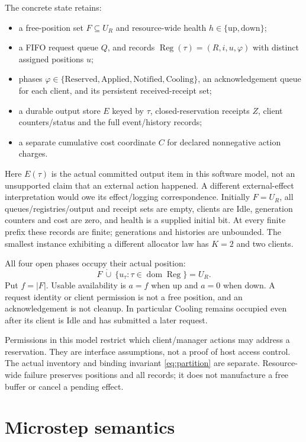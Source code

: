 \documentclass[11pt]{article}
\newcommand{\Reg}{\operatorname{Reg}}
\begin{document}
The concrete state retains:
\begin{itemize}
\item a free-position set $F\subseteq U_R$ and resource-wide health $h\in\{\mathrm{up},\mathrm{down}\}$;
\item a FIFO request queue $Q$, and records $\Reg(\tau)=(R,i,u,\varphi)$ with distinct assigned positions $u$;
\item phases $\varphi\in\{\mathrm{Reserved},\mathrm{Applied},\mathrm{Notified},\mathrm{Cooling}\}$, an acknowledgement queue for each client, and its persistent received-receipt set;
\item a durable output store $E$ keyed by $\tau$, closed-reservation receipts $Z$, client counters/status and the full event/history records;
\item a separate cumulative cost coordinate $C$ for declared nonnegative action charges.
\end{itemize}
Here $E(\tau)$ is the actual committed output item in this software model, not an unsupported claim that an external action happened. A different external-effect interpretation would owe its effect/logging correspondence. Initially $F=U_R$, all queues/registries/output and receipt sets are empty, clients are Idle, generation counters and cost are zero, and health is a supplied initial bit. At every finite prefix these records are finite; generations and histories are unbounded. The smallest instance exhibiting a different allocator law has $K=2$ and two clients.

All four open phases occupy their actual position:
\[
 F\ \dot\cup\ \{u_\tau:\tau\in\operatorname{dom}\Reg\}=U_R.
 \tag{P}\label{eq:partition}
\]
Put $f=|F|$. Usable availability is $a=f$ when up and $a=0$ when down. A request identity or client permission is not a free position, and an acknowledgement is not cleanup. In particular Cooling remains occupied even after its client is Idle and has submitted a later request.

Permissions in this model restrict which client/manager actions may address a reservation. They are interface assumptions, not a proof of host access control. The actual inventory and binding invariant \eqref{eq:partition} are separate. Resource-wide failure preserves positions and all records; it does not manufacture a free buffer or cancel a pending effect.

\section{Microstep semantics}
\end{document}
